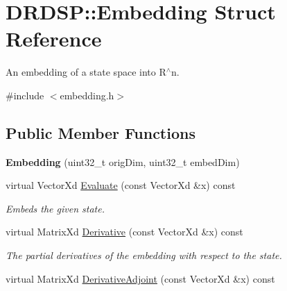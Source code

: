 \hypertarget{struct_d_r_d_s_p_1_1_embedding}{\section{D\-R\-D\-S\-P\-:\-:Embedding Struct Reference}
\label{struct_d_r_d_s_p_1_1_embedding}
}


An embedding of a state space into R$^\wedge$n.  




{\ttfamily \#include $<$embedding.\-h$>$}

\subsection*{Public Member Functions}
\begin{DoxyCompactItemize}
\item 
\hypertarget{struct_d_r_d_s_p_1_1_embedding_a044e60ce685c03b1e31a080455a47a43}{{\bfseries Embedding} (uint32\-\_\-t orig\-Dim, uint32\-\_\-t embed\-Dim)}\label{struct_d_r_d_s_p_1_1_embedding_a044e60ce685c03b1e31a080455a47a43}

\item 
\hypertarget{struct_d_r_d_s_p_1_1_embedding_a128ada65c8aafc9348dafd8c89add0da}{virtual Vector\-Xd \hyperlink{struct_d_r_d_s_p_1_1_embedding_a128ada65c8aafc9348dafd8c89add0da}{Evaluate} (const Vector\-Xd \&x) const }\label{struct_d_r_d_s_p_1_1_embedding_a128ada65c8aafc9348dafd8c89add0da}

\begin{DoxyCompactList}\small\item\em Embeds the given state. \end{DoxyCompactList}\item 
\hypertarget{struct_d_r_d_s_p_1_1_embedding_a18d562ec89da43df7dd66b1b8b694e85}{virtual Matrix\-Xd \hyperlink{struct_d_r_d_s_p_1_1_embedding_a18d562ec89da43df7dd66b1b8b694e85}{Derivative} (const Vector\-Xd \&x) const }\label{struct_d_r_d_s_p_1_1_embedding_a18d562ec89da43df7dd66b1b8b694e85}

\begin{DoxyCompactList}\small\item\em The partial derivatives of the embedding with respect to the state. \end{DoxyCompactList}\item 
\hypertarget{struct_d_r_d_s_p_1_1_embedding_a010327f5b83006a24e466deabad5a852}{virtual Matrix\-Xd \hyperlink{struct_d_r_d_s_p_1_1_embedding_a010327f5b83006a24e466deabad5a852}{Derivative\-Adjoint} (const Vector\-Xd \&x) const }\label{struct_d_r_d_s_p_1_1_embedding_a010327f5b83006a24e466deabad5a852}


\end{DoxyCompactItemize}
